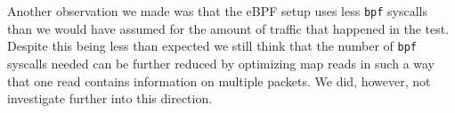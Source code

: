 Another observation we made was that the eBPF setup uses less \verb|bpf| syscalls than we would have assumed for 
the amount of traffic that happened in the test.
Despite this being less than expected we still think that the number of \verb|bpf| syscalls needed can be 
further reduced by optimizing map reads in such a way that one read contains information on multiple packets.
We did, however, not investigate further into this direction.